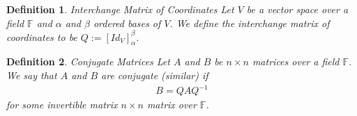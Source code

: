 \documentclass[12pt,answers]{exam}
\newcommand{\F}{\mathbb{F}}
\newtheorem{definition}{Definition}[section]
\begin{document}
\begin{definition}{Interchange Matrix of Coordinates}
Let $V$ be a vector space over a field $\F$ and $\alpha$ and $\beta$ ordered bases of $V$. We define the interchange matrix of coordinates to be $Q:=[Id_{V}]^{\beta}_{\alpha}$.
\end{definition}

\begin{definition}{Conjugate Matrices}
Let $A$ and $B$  be $n\times n$ matrices over a field $\F$. We say that $A$ and $B$ are conjugate (similar) if
\begin{align*}
    B=QAQ^{-1}
\end{align*}
for some invertible matrix $n\times n$ matrix over $\F$. 
\end{definition}
\end{document}
